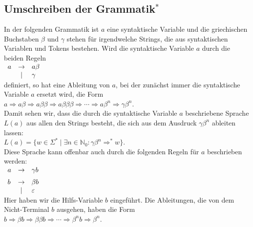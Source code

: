 \subsection{Umschreiben der Grammatik$^*$ \label{links-rekursion}}
In der folgenden Grammatik ist $a$ eine syntaktische Variable und die griechischen Buchstaben $\beta$ und
$\gamma$ stehen f\"ur irgendwelche Strings, die aus syntaktischen Variablen und Tokens bestehen.
Wird die syntaktische Variable $a$ durch die beiden Regeln
\\[0.2cm]
\hspace*{1.3cm}
$
\begin{array}[t]{lcl}
a & \rightarrow & a \beta \\
  & \mid        & \gamma
\end{array}
$
\\[0.2cm]
definiert, so hat eine Ableitung von $a$, bei der zun\"achst immer die syntaktische Variable $a$ ersetzt
wird, die Form 
\\[0.2cm]
\hspace*{1.3cm}
$a \Rightarrow a \beta \Rightarrow a \beta \beta \Rightarrow a \beta \beta \beta
 \Rightarrow \cdots \Rightarrow a \beta^n \Rightarrow \gamma \beta^n$.
\\[0.2cm]
Damit sehen wir, dass die durch die syntaktische Variable $a$ beschriebene Sprache $L(a)$ aus allen den
Strings besteht, die sich aus dem Ausdruck $\gamma \beta^n$ ableiten lassen:
\\[0.2cm]
\hspace*{1.3cm}
$L(a) = \bigl\{ w \in \Sigma^* \mid \exists n \in \mathbb{N}_0: \gamma \beta^n \Rightarrow^* w \bigr\}$.
\\[0.2cm]
Diese Sprache kann offenbar auch durch die folgenden Regeln f\"ur $a$ beschrieben werden:
\\[0.2cm]
\hspace*{1.3cm}
$
\begin{array}[t]{lcl}
a & \rightarrow & \gamma b \\[0.2cm]
b & \rightarrow & \beta b  \\
  & \mid        & \varepsilon 
\end{array}
$
\\[0.2cm]
Hier haben wir die Hilfs-Variable $b$ eingef\"uhrt.  Die Ableitungen, die von dem Nicht-Terminal $b$
ausgehen, haben die Form
\\[0.2cm]
\hspace*{1.3cm} $b \Rightarrow \beta b \Rightarrow \beta \beta b \Rightarrow \cdots \Rightarrow
\beta^n b \Rightarrow \beta^n$.
